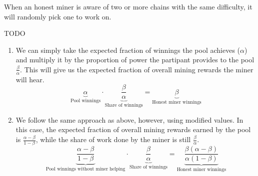\documentclass[12pt]{exam}
\newcommand{\Q}[1]{\question{\large{\textbf{#1}}}}
\begin{document}
\begin{questions}
\newpage
\Q{Problem 3}
\begin{solution}
  When an honest miner is aware of two or more chains with the same difficulty, it will randomly pick one to work on.

  TODO
\end{solution}

\newpage
\Q{Problem 4}
\begin{solution}
  \begin{enumerate}[label=\textbf{\alph*.}]
    \item
      We can simply take the expected fraction of winnings the pool achieves ($\alpha$) and multiply it by the proportion of power the partipant provides to the pool $\frac{\beta}{\alpha}$. This will give us the expected fraction of overall mining rewards the miner will hear.
      \[
        \underbrace{\alpha}_{\text{Pool winnings}} \cdot \underbrace{\frac{\beta}{\alpha}}_{\text{Share of winnings}} = \underbrace{\beta}_{\text{Honest miner winnings}}
      \]
    \item
      We follow the same approach as above, however, using modified values. In this case, the expected fraction of overall mining rewards earned by the pool is $\frac{\alpha - \beta}{1 - \beta}$, while the share of work done by the miner is still $\frac{\beta}{\alpha}$.
      \[
         \underbrace{\frac{\alpha - \beta}{1-\beta}}_{\text{Pool winnings without miner helping}} \cdot \underbrace{\frac{\beta}{\alpha}}_{\text{Share of winnings}} = \underbrace{\frac{\beta(\alpha - \beta)}{{\alpha(1-\beta)}}}_{\text{Honest miner winnings}}
      \]
  \end{enumerate}
\end{solution}
\end{questions}
\end{document}
